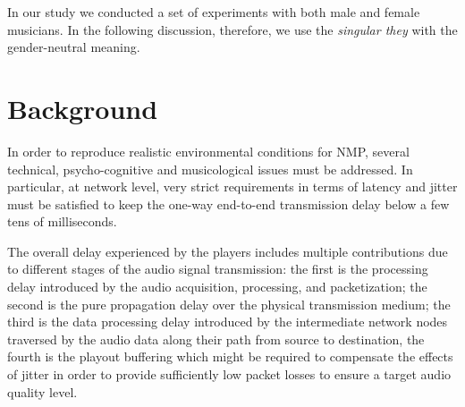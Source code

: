In our study we conducted a set of experiments with both male and female musicians. In the following discussion, therefore, we use the \textit{singular they} with the gender-neutral meaning. 



\section{Background}\label{sec:NMP:background}
In order to reproduce realistic environmental conditions for NMP, several technical, psycho-cognitive and musicological issues must be addressed. In particular, at network level, very strict requirements in terms of latency and jitter must be satisfied to keep the one-way end-to-end transmission delay below a few tens of milliseconds. 

The overall delay experienced by the players includes multiple contributions due to different stages of the audio signal transmission: the first is the processing delay introduced by the audio acquisition, processing, and packetization; the second is the pure propagation delay over the physical transmission medium; the third is the data processing delay introduced by the intermediate network nodes traversed by the audio data along their path from source to destination, the fourth is the playout buffering which might be required to compensate the effects of jitter in order to provide sufficiently low packet losses to ensure a target audio quality level.

